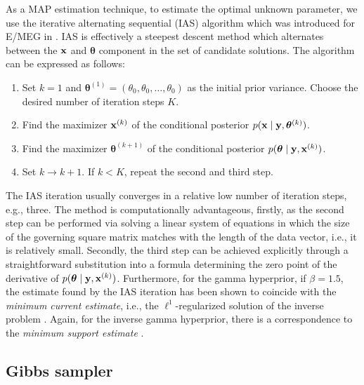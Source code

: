 \documentclass[5p]{elsarticle}
\begin{document}
As a MAP estimation technique, to estimate the optimal unknown parameter, we use the iterative alternating sequential (IAS) algorithm \citep{calvetti2007gaussian,calvetti2008hypermodels}
which was introduced for E/MEG in \cite{calvetti2009}. IAS is effectively a steepest descent method which  alternates between the ${\bf x}$ and ${\bm \theta}$ component in the set of candidate solutions. The algorithm can be expressed as follows: 
\begin{enumerate} 
\item Set $k = 1$ and ${\bm \theta}^{(1)} = (\theta_0, \theta_0, \ldots, \theta_0)$ as the initial prior variance. Choose the desired number  of iteration steps $K$. 

\item Find the maximizer ${\bf x}^{(k)}$ of the conditional posterior $p ({\bf x} \mid {\bf y}, {\bm \theta}^{(k)})$.
\item Find the maximizer ${\bm \theta}^{(k+1)}$ of the conditional posterior $p ({\bm \theta} \mid {\bf y}, {\bf x}^{(k)})$.
\item Set $k \to k + 1$. If $k < K$, repeat the second and third step. 
\end{enumerate}
The IAS iteration usually converges in a relative low number of iteration steps, e.g., three. The method is computationally advantageous, firstly, as the second step can be performed via solving a linear system of equations in which the size of the governing square matrix matches with the length of the data vector, i.e., it is relatively small. Secondly, the third step can be achieved explicitly through a straightforward substitution into a formula determining the zero point of the derivative of $p ({\bm \theta} \mid {\bf y}, {\bf x}^{(k)})$. Furthermore, for the gamma hyperprior, if $\beta = 1.5$, the estimate found by the IAS iteration has been shown  to coincide with the {\em minimum current estimate}, i.e., the $\ell^1$-regularized solution of the inverse problem \cite{uuhaso99,hauk2004keep,auranen2005}. Again, for the inverse gamma hyperprior, there is a correspondence to the {\em minimum support estimate}    \citep{calvetti2009}.

\subsection{Gibbs sampler}
\end{document}
